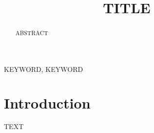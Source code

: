 \documentclass[10pt,conference]{IEEEtran}
\begin{document}
\title{TITLE}

\author{
}   %

\maketitle

\begin{abstract}
ABSTRACT
\end{abstract}

\begin{IEEEkeywords}
KEYWORD, KEYWORD
\end{IEEEkeywords}

\section{Introduction}
TEXT



\end{document}

